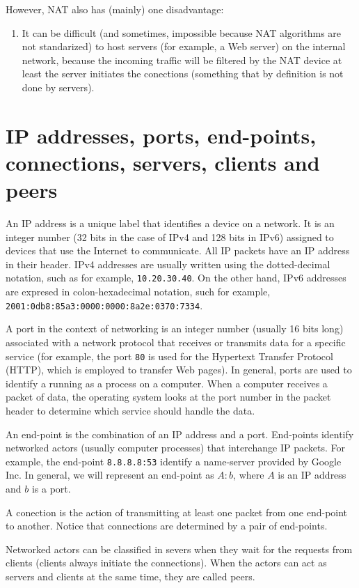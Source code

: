 However, NAT also has (mainly) one disadvantage:
\begin{enumerate}
\item It can be difficult (and sometimes, impossible because NAT
  algorithms are not standarized) to host servers (for example, a Web
  server) on the internal network, because the incoming traffic will
  be filtered by the NAT device at least the server initiates the
  conections (something that by definition is not done by servers).
\end{enumerate}

\section{IP addresses, ports, end-points, connections, servers, clients and peers}

An IP address is a unique label that identifies a device on a
network. It is an integer number (32 bits in the case of IPv4 and 128
bits in IPv6) assigned to devices that use the Internet to
communicate. All IP packets have an IP address in their header. IPv4
addresses are usually written using the dotted-decimal notation, such
as for example, \texttt{10.20.30.40}. On the other hand, IPv6
addresses are expresed in colon-hexadecimal notation, such for
example, \texttt{2001:0db8:85a3:0000:0000:8a2e:0370:7334}.

A port in the context of networking is an integer number (usually 16
bits long) associated with a network protocol that receives or
transmits data for a specific service (for example, the port
\texttt{80} is used for the Hypertext Transfer Protocol (HTTP), which
is employed to transfer Web pages). In general, ports are used to
identify a running as a process on a computer. When a computer
receives a packet of data, the operating system looks at the port
number in the packet header to determine which service should handle
the data.

An end-point is the combination of an IP address and a
port. End-points identify networked actors (usually computer
processes) that interchange IP packets. For example, the end-point
\texttt{8.8.8.8:53} identify a name-server provided by Google Inc. In
general, we will represent an end-point as $A:b$, where $A$ is an
IP address and $b$ is a port.

A conection is the action of transmitting at least one packet from one
end-point to another. Notice that connections are determined by a pair
of end-points.

Networked actors can be classified in severs when they wait for the
requests from clients (clients always initiate the connections). When
the actors can act as servers and clients at the same time, they are
called peers.

